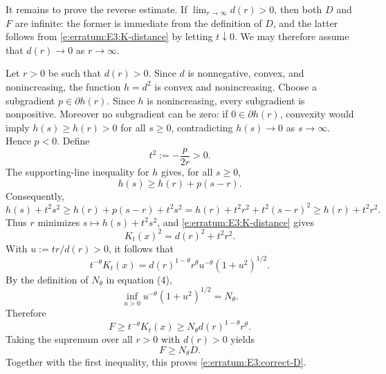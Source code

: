It remains to prove the reverse estimate.  If
$\lim_{r\to\infty}d(r)>0$, then both $D$ and $F$ are infinite: the former is
immediate from the definition of $D$, and the latter follows from
\eqref{e:erratum:E3:K-distance} by letting $t\downarrow0$.  We may therefore
assume that $d(r)\to0$ as $r\to\infty$.

Let $r>0$ be such that $d(r)>0$.  Since $d$ is nonnegative, convex, and
nonincreasing, the function $h=d^2$ is convex and nonincreasing.  Choose a
subgradient $p\in\partial h(r)$.  Since $h$ is nonincreasing, every
subgradient is nonpositive.  Moreover no subgradient can be zero: if
$0\in\partial h(r)$, convexity would imply $h(s)\geq h(r)>0$ for all
$s\geq0$, contradicting $h(s)\to0$ as $s\to\infty$.  Hence $p<0$.
Define
\[
	t^2:=-\frac{p}{2r}>0 .
\]
The supporting-line inequality for $h$ gives, for all $s\geq0$,
\[
	h(s)\geq h(r)+p(s-r).
\]
Consequently,
\[
	h(s)+t^2s^2
	\geq
	h(r)+p(s-r)+t^2s^2
	=
	h(r)+t^2r^2+t^2(s-r)^2
	\geq
	h(r)+t^2r^2 .
\]
Thus $r$ minimizes $s\mapsto h(s)+t^2s^2$, and
\eqref{e:erratum:E3:K-distance} gives
\[
	K_t(x)^2=d(r)^2+t^2r^2 .
\]
With $u:=tr/d(r)>0$, it follows that
\[
	t^{-\theta}K_t(x)
	=
	d(r)^{1-\theta}r^\theta
	u^{-\theta}(1+u^2)^{1/2} .
\]
By the definition of $N_\theta$ in equation (4),
\[
	\inf_{u>0}u^{-\theta}(1+u^2)^{1/2}=N_\theta .
\]
Therefore
\[
	F\geq t^{-\theta}K_t(x)
	\geq
	N_\theta d(r)^{1-\theta}r^\theta .
\]
Taking the supremum over all $r>0$ with $d(r)>0$ yields
\[
	F\geq N_\theta D .
\]
Together with the first inequality, this proves
\eqref{e:erratum:E3:correct-D}.
